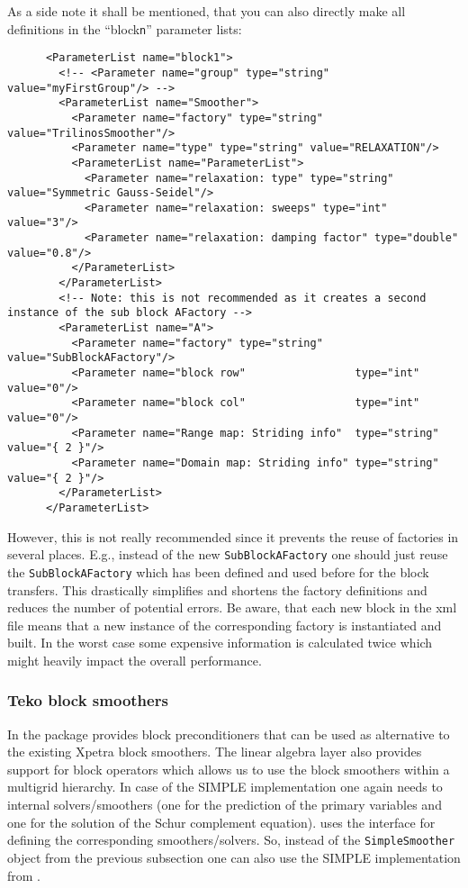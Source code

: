 \documentclass[10pt,fleqn]{book}
\begin{document}
As a side note it shall be mentioned, that you can also directly make all definitions in the ``block\texttt{n}'' parameter lists:
\begin{lstlisting}
      <ParameterList name="block1">
        <!-- <Parameter name="group" type="string" value="myFirstGroup"/> -->
        <ParameterList name="Smoother">
          <Parameter name="factory" type="string" value="TrilinosSmoother"/>
          <Parameter name="type" type="string" value="RELAXATION"/>
          <ParameterList name="ParameterList">
            <Parameter name="relaxation: type" type="string" value="Symmetric Gauss-Seidel"/>
            <Parameter name="relaxation: sweeps" type="int"    value="3"/>
            <Parameter name="relaxation: damping factor" type="double" value="0.8"/>
          </ParameterList>
        </ParameterList>
        <!-- Note: this is not recommended as it creates a second instance of the sub block AFactory -->
        <ParameterList name="A">
          <Parameter name="factory" type="string" value="SubBlockAFactory"/>
          <Parameter name="block row"                 type="int"     value="0"/>
          <Parameter name="block col"                 type="int"     value="0"/>
          <Parameter name="Range map: Striding info"  type="string"  value="{ 2 }"/>
          <Parameter name="Domain map: Striding info" type="string"  value="{ 2 }"/>
        </ParameterList>
      </ParameterList>
\end{lstlisting}
However, this is not really recommended since it prevents the reuse of factories in several places. E.g., instead of the new  \texttt{SubBlockAFactory} one should just reuse the \texttt{SubBlockAFactory} which has been defined and used before for the block transfers. This drastically simplifies and shortens the factory definitions and reduces the number of potential errors. Be aware, that each new block in the xml file means that a new instance of the corresponding factory is instantiated and built. In the worst case some expensive information is calculated twice which might heavily impact the overall performance.

\subsubsection{Teko block smoothers}

In \trilinos the \teko package provides block preconditioners that can be used as alternative to the existing Xpetra block smoothers. The \xpetra linear algebra layer also provides support for \thyra block operators which allows us to use the \teko block smoothers within a \muelu multigrid hierarchy. In case of the \teko SIMPLE implementation one again needs to internal solvers/smoothers (one for the prediction of the primary variables and one for the solution of the Schur complement equation). \teko uses the \stratimikos interface for defining the corresponding smoothers/solvers. So, instead of the \texttt{SimpleSmoother} object from the previous subsection one can also use the SIMPLE implementation from \teko.
\end{document}

